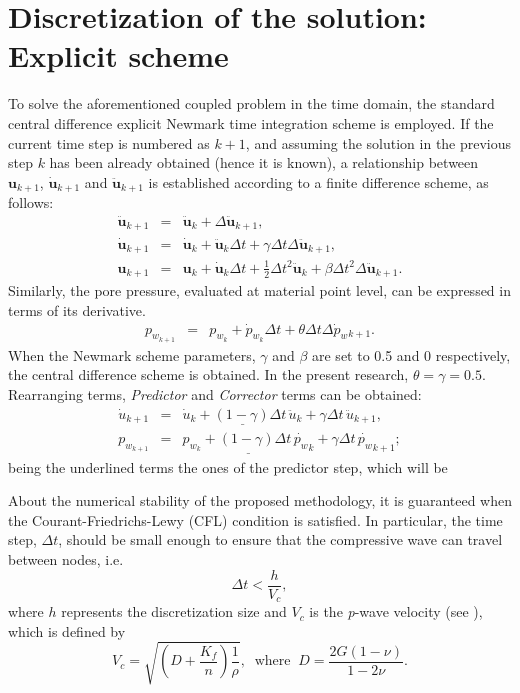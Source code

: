 \documentclass[twocolumn]{svjour3}          %
\begin{document}
\section{Discretization of the solution: Explicit scheme}
\label{sec:4}
To solve the aforementioned coupled problem in the time domain, the standard central difference explicit Newmark time integration scheme is employed. If the current time step is numbered as $k+1$, and assuming the solution in the previous step $k$ has been already obtained (hence it is known), a relationship between $\textbf{u}_{k+1}$, $\dot{\textbf{u}}_{k+1}$ and $\ddot{\textbf{u}}_{k+1}$ is established according to a finite difference scheme, as follows: 
\begin{eqnarray}
\ddot{\boldsymbol{u}}_{k+1} &=&\ddot{\boldsymbol{u}}_{k}+\Delta \ddot{\boldsymbol{u}}_{k+1},  \nonumber \\
\dot{\boldsymbol{u}}_{k+1} &=&\dot{\boldsymbol{u}}_k+\ddot{\boldsymbol{u}}_{k}\Delta t+\gamma \Delta t \Delta \ddot{\boldsymbol{u}}_{k+1}, \nonumber \\
\boldsymbol{u}_{k+1}&=&\boldsymbol{u}_{k}+\dot{\boldsymbol{u}}_{k} \Delta t+\frac{1}{2} \Delta t^{2} \ddot{\boldsymbol{u}}_{k}+\beta\Delta t^{2}\Delta \ddot{\boldsymbol{u}}_{k+1}. \label{eq_Nw}
\end{eqnarray}
Similarly, the pore pressure, evaluated at material point level, can be expressed in terms of its derivative.
\begin{eqnarray}
p_{w_{k+1}} &=&p_{w_k}+\dot{p}_{w_k}\Delta t+\theta \Delta t \Delta \dot{p}_w{_{k+1}}.  \label{eq_Nw_p}
\end{eqnarray}
When the Newmark scheme parameters, $\gamma$ and $\beta$ are set to 0.5 and 0 respectively, the central difference scheme is obtained. In the present research, $\theta=\gamma=0.5$. Rearranging terms, \textit{Predictor} and \textit{Corrector} terms can be obtained:
\begin{eqnarray}
\dot{u}_{k+1}&=&\underline{\dot{u}_{k}+(1-\gamma)\Delta t \,  \ddot{u}_{k}} + \gamma \Delta t \,  \ddot{u}_{k+1} \label{pc_1}, \\
p_{w_{k+1}}&=&\underline{p_{w_{k}}+(1-\gamma)\Delta t \,  \dot{p_w}_{k}} + \gamma \Delta t \,  \dot{p_w}_{k+1} \label{pc_2};
\end{eqnarray}
being the underlined terms the ones of the predictor step, which will be 

About the numerical stability of the proposed methodology, it is guaranteed when the Courant-Friedrichs-Lewy (CFL) condition is satisfied. In particular, the time step, $\Delta t$, should be small enough to ensure that the compressive wave can travel between nodes, i.e. 
  \begin{equation}
\Delta t < \frac{h}{V_c},
\end{equation}
where $h$ represents the discretization size and $V_c$ is the \textit{p}-wave velocity (see \cite{zienkiewicz1980}), which is defined by  
\begin{equation}
V_c=\sqrt{\left( D+\frac{K_f}{n}\right) \frac{1}{\rho}}, \; \; \textrm{where} \;\; D=\frac{2G(1-\nu)}{1-2\nu}.
\end{equation}\label{ex_2}
\end{document}
